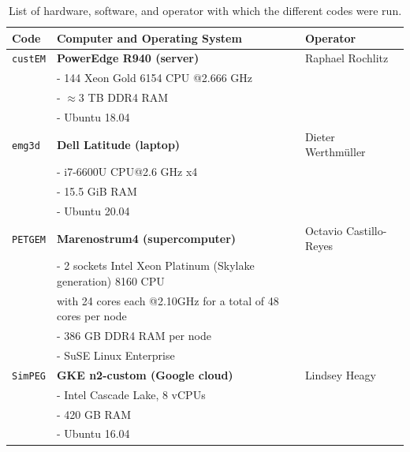 \documentclass[a4paper, extra, camera,%
]{gji}
\newcommand{\simpeg}{\texttt{SimPEG}\xspace}
\newcommand{\custem}{\texttt{custEM}\xspace}
\newcommand{\petgem}{\texttt{PETGEM}\xspace}
\begin{document}
%
\begin{table}
\begin{minipage}{14cm}
  \centering
  \caption{List of hardware, software, and operator with which the different codes were run.}
\label{tbl:machines}
  \begin{tabularx}{\linewidth}{lXl}
  \toprule
  Code & Computer and Operating System & Operator \\
  \midrule
  \custem & \textbf{PowerEdge R940 (server)}                  & Raphael Rochlitz \\
          & - 144 Xeon Gold 6154 CPU @2.666 GHz               & \\
          & - $\approx3$ TB DDR4 RAM                          & \\
          & - Ubuntu 18.04                                    & \\[.5em]
  \texttt{emg3d}  & \textbf{Dell Latitude (laptop)}                   & Dieter Werthmüller \\
          & - i7-6600U CPU@2.6 GHz x4                         & \\
          & - 15.5 GiB RAM                                    & \\
          & - Ubuntu 20.04                                    & \\[.5em]
  \petgem & \textbf{Marenostrum4 (supercomputer)}             & Octavio Castillo-Reyes \\
          & - 2 sockets Intel Xeon Platinum (Skylake generation) 8160 CPU & \\
          & \phantom{-} with 24 cores each @2.10GHz for a total of 48 cores per node & \\
          & - 386 GB DDR4 RAM per node                        & \\
          & - SuSE Linux Enterprise                           & \\[.5em]
  \simpeg & \textbf{GKE n2-custom (Google cloud)}             & Lindsey Heagy \\
          & - Intel Cascade Lake, 8 vCPUs                     & \\
          & - 420 GB RAM                                      & \\
          & - Ubuntu 16.04                                    & \\
%
  \bottomrule
\end{tabularx}
\end{minipage}
\end{table}
%
\end{document}

